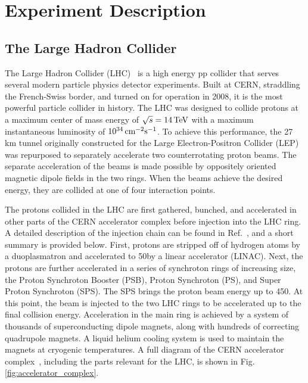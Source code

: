 \chapter{Experiment Description}\label{sec:experiment}

\section{The Large Hadron Collider}
The Large Hadron Collider (LHC)~\cite{Evans_2008} is a high energy pp collider that serves several modern particle physics detector experiments. 
Built at CERN, straddling the French-Swiss border, and turned on for operation in 2008, it is the most powerful particle collider in history. 
The LHC was designed to collide protons at a maximum center of mass energy of $\sqrt s = 14\,\text{Te\hspace{-.08em}V}$ 
with a maximum instantaneous luminosity of $10^{34}\,\text{cm}^{-2}\mathrm{s}^{-1}$. To achieve this performance, the 27 km tunnel 
originally constructed for the Large Electron-Positron Collider (LEP)~\cite{Myers:226776} was repurposed to separately 
accelerate two counterrotating proton beams. The separate acceleration of the beams is made possible by oppositely oriented 
magnetic dipole fields in the two rings. When the beams achieve the desired energy, they are collided at one of four interaction points. 

The protons collided in the LHC are first gathered, bunched, and accelerated in other parts of the CERN accelerator complex before injection into the LHC ring. A detailed description of the injection chain can be found in Ref.~\cite{Benedikt:2004wm}, and a short summary is provided below. 
First, protons are stripped off of hydrogen atoms by a duoplasmatron and accelerated to 50\MeV by a linear accelerator (LINAC). Next, the protons are further accelerated 
in a series of synchroton rings of increasing size, the Proton Synchroton Booster (PSB), Proton Synchroton (PS), and Super Proton Synchroton (SPS). The SPS brings the 
proton beam energy up to 450\GeV. At this point, the beam is injected to the two LHC rings to be accelerated up to the final collision energy. Acceleration in the main 
ring is achieved by a system of thousands of superconducting dipole magnets, along with hundreds of correcting quadrupole magnets. A liquid helium cooling system is 
used to maintain the magnets at cryogenic temperatures. A full diagram of the CERN accelerator complex~\cite{CERN_complex}, including the parts relevant for the LHC, is shown in Fig. \ref{fig:accelerator_complex}.

